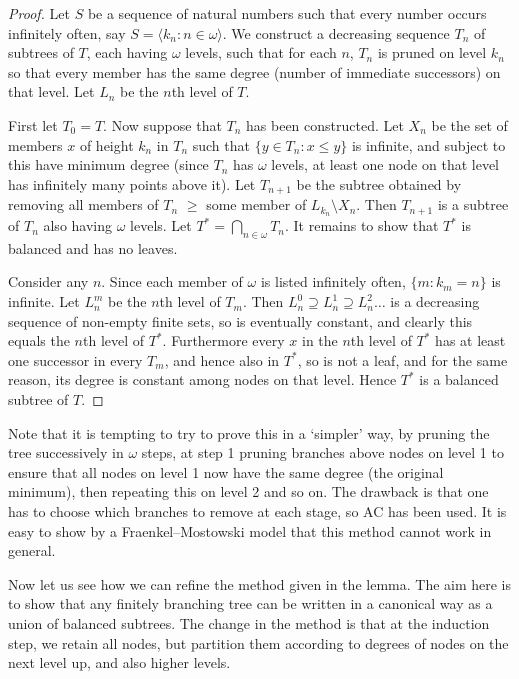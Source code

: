 \documentclass[a4paper,reqno]{amsart}
\numberwithin{equation}{section}
\begin{document}
\begin{proof} Let $S$ be a sequence of natural numbers such that every number occurs infinitely often, 
say $S = \langle k_n: n \in \omega \rangle$. We construct a decreasing sequence $T_n$ of subtrees 
of $T$, each having $\omega$ levels, such that for each $n$, $T_n$ is pruned on level $k_n$ so that 
every member has the same degree (number of immediate successors) on that level. Let $L_n$ be the 
$n$th level of $T$.

First let $T_0 = T$. Now suppose that $T_n$ has been constructed. Let $X_n$ be the set of
members $x$ of height $k_n$ in $T_n$ such that $\{y \in T_n: x \le y\}$ is infinite, and subject to 
this have minimum degree (since $T_n$ has $\omega$ levels, at least one node on that level has 
infinitely many points above it). Let $T_{n+1}$ be the subtree obtained by removing all members 
of $T_n$ $\ge$ some member of $L_{k_n} \setminus X_n$. Then $T_{n+1}$ is a subtree of $T_n$ also having
$\omega$ levels. Let $T^* = \bigcap_{n \in \omega} T_n$. It remains to show that $T^*$ is balanced 
and has no leaves.

Consider any $n$. Since each member of $\omega$ is listed infinitely often, $\{m: k_m = n\}$ is
infinite. Let $L_n^m$ be the $n$th level of $T_m$. Then $L_n^0 \supseteq L_n^1 \supseteq L_n^2 \ldots$
is a decreasing sequence of non-empty finite sets, so is eventually constant, and clearly this equals the 
$n$th level of $T^*$. Furthermore every $x$ in the $n$th level of $T^*$ has at least one successor in
every $T_m$, and hence also in $T^*$, so is not a leaf, and for the same reason, its degree is 
constant among nodes on that level. Hence $T^*$ is a balanced subtree of $T$.
  \end{proof} 

Note that it is tempting to try to prove this in a `simpler' way, by pruning the tree successively
in $\omega$ steps, at step 1 pruning branches above nodes on level 1 to ensure that all nodes on
level 1 now have the same degree (the original minimum), then repeating this on level 2 and so on. 
The drawback is that one has to choose which branches to remove at each stage, so AC has been used.
It is easy to show by a Fraenkel--Mostowski model that this method cannot work in general. 

Now let us see how we can refine the method given in the lemma. The aim here is to show that any
finitely branching tree can be written in a canonical way as a union of balanced subtrees. The change in 
the method is that at the induction step, we retain all nodes, but partition them according to degrees 
of nodes on the next level up, and also higher levels.
\end{document}
